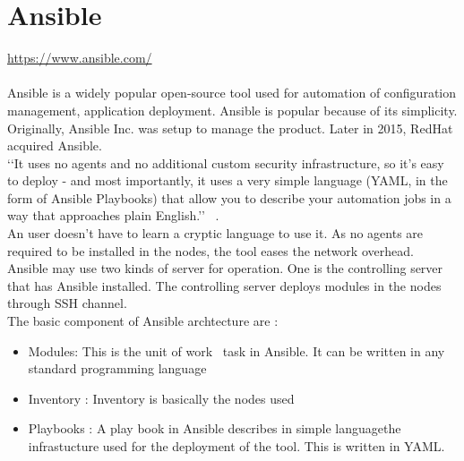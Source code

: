 \section{Ansible}
\url{ https://www.ansible.com/ } \\
\\
Ansible is a widely popular open-source tool used for automation of configuration management,
application deployment. Ansible is popular because of its simplicity. Originally, Ansible Inc.
was setup to manage the product. Later in 2015, RedHat acquired Ansible.\\
‘‘It uses no agents and no additional custom security infrastructure, so it’s easy to deploy - 
and most importantly, it uses a very simple language (YAML, in the form of Ansible Playbooks) 
that allow you to describe your automation jobs in a way that approaches plain English.’’
~\cite {hid-sp18-417-doc-Ansible}. \\
An user doesn’t have to learn a cryptic language to use it. 
As no agents are required to be installed in the nodes, the tool eases the network overhead. \\
Ansible may use two kinds of server for operation. One is the controlling server that has Ansible installed.
The controlling server deploys modules in the nodes through SSH channel. \\
The basic component of Ansible archtecture are : \\
\begin{itemize}
\item        Modules: This is the unit of work \ task in Ansible. It can be written in any standard programming language
\item        Inventory : Inventory is basically the nodes used
\item        Playbooks : A play book in Ansible describes in simple languagethe 
infrastucture used for the deployment of the tool. This is written in YAML.
\end{itemize}



